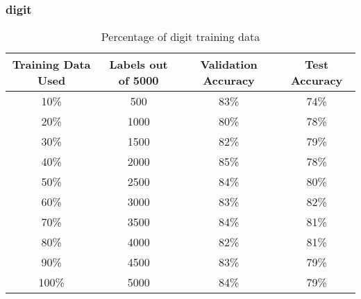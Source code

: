 \documentclass{article}
\begin{document}
        \subsubsection{digit}
            \begin{table}[h]
                \centering
                \begin{tabular}{c|c|c|c}
                    \hline
                        Training Data Used & Labels out of 5000 & Validation Accuracy & Test Accuracy \\
                    \hline
                        10\% & 500 & 83\% & 74\%\\
                    \hline
                        20\% & 1000 & 80\% & 78\%\\
                    \hline
                        30\% & 1500 & 82\% & 79\%\\
                    \hline
                        40\% & 2000 & 85\% & 78\%\\
                    \hline
                        50\% & 2500 & 84\% & 80\%\\
                    \hline
                        60\% & 3000 & 83\% & 82\%\\
                    \hline
                        70\% & 3500 & 84\% & 81\%\\
                    \hline
                        80\% & 4000 & 82\% & 81\%\\
                    \hline
                        90\% & 4500 & 83\% & 79\%\\
                    \hline
                        100\% & 5000 & 84\% & 79\%\\
                    \hline
                \end{tabular}
                \caption{Percentage of digit training data}
            \end{table}
        \newpage
\end{document}
